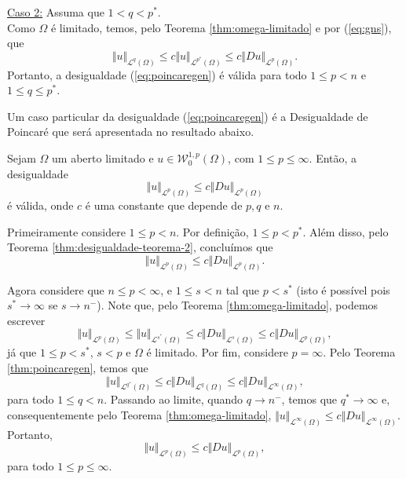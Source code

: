 \documentclass[a4paper, 11pt]{book}
\theoremstyle{definition}
\newcommand{\cL}{\mathcal{L}}
\newcommand{\cW}{\mathcal{W}}
\begin{document}
\begin{prf}
    \underline{Caso 2:} Assuma que $1 < q < p^*$.\\
    Como $\Omega$ é limitado, temos, pelo Teorema \ref{thm:omega-limitado} e por (\ref{eq:gns}), que
    \[
        \Vert u \Vert_{\cL^q(\Omega)} \leqslant c\Vert u \Vert_{\cL^{p^*}(\Omega)} \leqslant c \Vert Du \Vert_{\cL^p(\Omega)}.
    \]
    Portanto, a desigualdade (\ref{eq:poincaregen}) é válida para todo $1 \leqslant p < n$ e $1 \leqslant q \leqslant p^*$.
\end{prf}

Um caso particular da desigualdade (\ref{eq:poincaregen}) é a Desigualdade de Poincaré que será apresentada no resultado abaixo.

\begin{cbox} \label{cl:poincare}
   Sejam $\Omega$ um aberto limitado e $u \in \cW^{1,p}_0(\Omega)$, com $1 \leqslant p \leqslant \infty$. Então, a desigualdade
   \[
        \Vert u \Vert_{\cL^p(\Omega)} \leqslant c\Vert Du \Vert_{\cL^p(\Omega)}
   \]
   é válida,
   onde $c$ é uma constante que depende de $p, q$ e $n$.
\end{cbox}
\begin{prf}
    Primeiramente considere $1 \leqslant p < n$.
    Por definição, $1 \leqslant p < p^*$. Além disso, pelo Teorema \ref{thm:desigualdade-teorema-2}, concluímos que
    \[
        \Vert u \Vert_{\cL^p(\Omega)} \leqslant c \Vert Du \Vert_{\cL^p(\Omega)}.
    \]

    Agora considere que $n \leqslant p < \infty$, e $1 \leqslant s < n$ tal que $p < s^*$ (isto é possível pois $s^* \to \infty$ se $s \to n^-$).
    Note que, pelo Teorema \ref{thm:omega-limitado}, podemos escrever
    \[
        \Vert u \Vert_{\cL^p(\Omega)} \leqslant \Vert u \Vert_{\cL^{s^*}(\Omega)} \leqslant c \Vert Du \Vert_{\cL^s(\Omega)} \leqslant c \Vert Du \Vert_{\cL^p(\Omega)},
    \]
    já que $1 \leqslant p < s^*$, $s < p$ e $\Omega$ é limitado.
    Por fim, considere $p = \infty$.
    Pelo Teorema \ref{thm:poincaregen}, temos que
    \[
        \Vert u \Vert_{\cL^{q^*}(\Omega)} \leqslant c \Vert Du \Vert_{\cL^{q}(\Omega)} \leqslant c \Vert Du \Vert_{\cL^\infty(\Omega)},
    \]
    para todo $1 \leqslant q < n$.
    Passando ao limite, quando $q \to n^-$, temos que $q^* \to \infty$ e, consequentemente pelo Teorema \ref{thm:omega-limitado}, $\Vert u \Vert_{\cL^\infty(\Omega)} \leqslant c \Vert Du \Vert_{\cL^\infty(\Omega)}$.
    Portanto,
    \[
        \Vert u \Vert_{\cL^p(\Omega)} \leqslant c\Vert Du \Vert_{\cL^p(\Omega)},
    \]
    para todo $1 \leqslant p \leqslant \infty$.
\end{prf}
\end{document}
